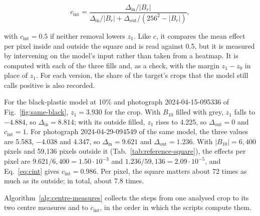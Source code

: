 \begin{equation}
c_{\mathrm{int}} =
\dfrac{\Delta_{\mathrm{in}} / |B_r|}{\Delta_{\mathrm{in}} / |B_r| +
\Delta_{\mathrm{out}} / (256^2 - |B_r|)},
\label{eq:cint}
\end{equation}

with $c_{\mathrm{int}} = 0.5$ if neither removal lowers $z_1$. Like $c$, it compares
the mean effect per pixel inside and outside the square and is read against 0.5, but it
is measured by intervening on the model's input rather than taken from a heatmap. It is
computed with each of the three fills and, as a check, with the margin $z_1 - z_0$ in
place of $z_1$. For each version, the share of the target's crops that the model still
calls positive is also recorded.

For the black-plastic model at 10\% and photograph 2024-04-15-095336 of
Fig.~\ref{fig:same-black}, $z_1 = 3.930$ for the crop. With $B_{10}$ filled with grey,
$z_1$ falls to $-4.884$, so $\Delta_{\mathrm{in}} = 8.814$; with its outside filled,
$z_1$ rises to 4.225, so $\Delta_{\mathrm{out}} = 0$ and $c_{\mathrm{int}} = 1$. For
photograph 2024-04-29-094549 of the same model, the three values are 5.583, $-4.038$ and
4.347, so $\Delta_{\mathrm{in}} = 9.621$ and $\Delta_{\mathrm{out}} = 1.236$. With
$|B_{10}| = 6{,}400$ pixels and 59,136 pixels outside it
(Tab.~\ref{tab:reference-square}), the effects per pixel are $9.621/6{,}400 = 1.50
\cdot 10^{-3}$ and $1.236/59{,}136 = 2.09 \cdot 10^{-5}$, and Eq.~\eqref{eq:cint} gives
$c_{\mathrm{int}} = 0.986$. Per pixel, the square matters about 72 times as much as its
outside; in total, about 7.8 times.

Algorithm~\ref{alg:centre-measures} collects the steps from one analysed crop to its two
centre measures and to $c_{\mathrm{int}}$, in the order in which the scripts compute them.

